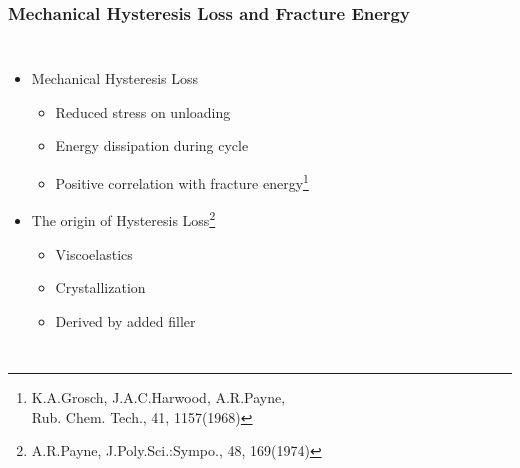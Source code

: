 \documentclass[12pt, dvipdfmx]{beamer}
\begin{document}
\begin{frame}
	\frametitle{Mechanical Hysteresis Loss and Fracture Energy}
	\vspace{-1mm}
			\begin{columns}[T, onlytextwidth]
					\begin{itemize}
						\item Mechanical Hysteresis Loss 
							\begin{itemize}
								\item Reduced stress on unloading
								\item Energy dissipation during cycle
								\item \alert{Positive correlation} with fracture energy\footnote{
									\scriptsize{K.A.Grosch, J.A.C.Harwood, A.R.Payne, \\Rub. Chem. Tech., 41, 1157(1968)}
								}
							\end{itemize}
						\item The origin of Hysteresis Loss\footnote{
							\scriptsize{A.R.Payne, J.Poly.Sci.:Sympo., 48, 169(1974)}
						}
						\begin{itemize}
							\item \alert{Viscoelastics}
							\color{blue}
							\item Crystallization
							\item Derived by added filler
						\end{itemize}
					\end{itemize}
				\begin{center}
					\vspace{-2mm}

\end{center}
\end{columns}
\end{frame}
\end{document}
